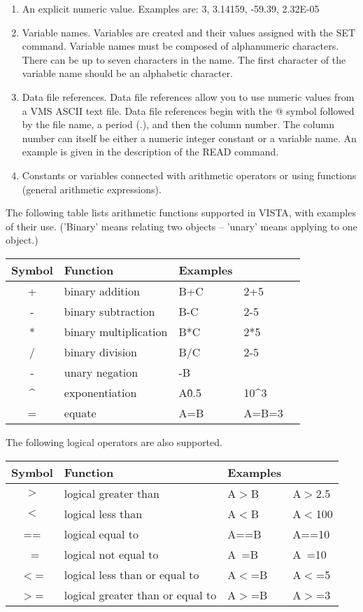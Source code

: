 \begin{enumerate}
  \item{An explicit numeric value.  Examples are: 3, 3.14159, -59.39, 2.32E-05}
  \item{Variable names.  Variables are created and their values 
    assigned with the SET command.  Variable names must be 
    composed of alphanumeric characters.  There can be up to
    seven characters in the name.  The first character of the
    variable name should be an alphabetic character.}
  \item{Data file references.  Data file references allow you to
    use numeric values from a VMS ASCII text file.  Data file
    references begin with the @ symbol followed by the file
    name, a period (.), and then the column number.  The
    column number can itself be either a numeric integer constant
    or a variable name.  An example is given in the description
    of the READ command.}
  \item{Constants or variables connected with arithmetic operators
    or using functions (general arithmetic expressions).}
\end{enumerate}

The following table lists arithmetic functions supported in VISTA, with
examples of their use.  ('Binary' means relating two objects -- 'unary'
means applying to one object.)

\begin{center}
\begin{tabular}{cllll}
Symbol&Function&Examples&&\\
\hline
+&binary addition&B+C&2+5\\
-&binary subtraction&B-C&2-5\\
*&binary multiplication &B*C&2*5\\
/&binary division&B/C&2-5\\
-&unary negation&-B&&\\
\^{}&exponentiation&A\^0.5&10\^{}3\\
=&equate&A=B&A=B=3\\
\hline
\end{tabular}
\end{center}

The following logical operators are also supported.

\begin{center}
\begin{tabular}{clll}
Symbol&Function&Examples&\\
\hline
$>$&logical greater than&A$>$B&A$>$2.5\\
$<$&logical less than&A$<$B&A$<$100\\
==&logical equal to&A==B&A==10\\
~=&logical not equal to&A~=B&A~=10\\
$<$=&logical less than or equal to&A$<$=B&A$<$=5\\
$>$=&logical greater than or equal to&A$>$=B&A$>$=3\\
\hline
\end{tabular}
\end{center}


